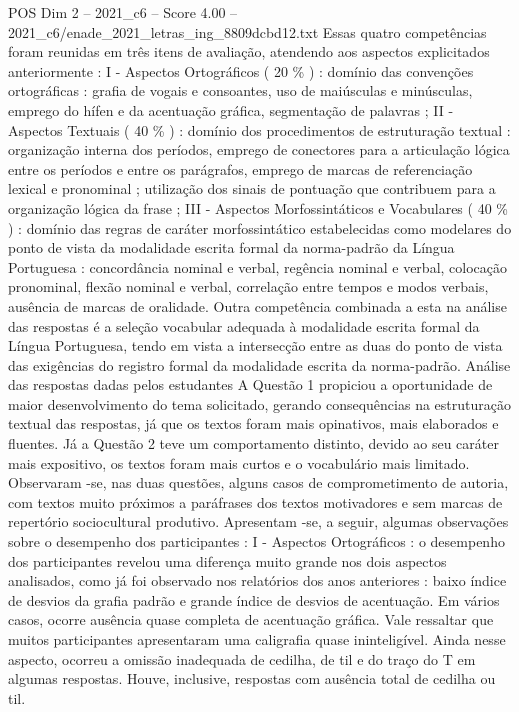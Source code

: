 \begin{textsample}{POS Dim 2 – 2021\_c6 – Score 4.00 – 2021\_c6/enade\_2021\_letras\_ing\_8809dcbd12.txt}
Essas quatro competências foram reunidas em três itens de avaliação, atendendo aos aspectos explicitados anteriormente : I - Aspectos Ortográficos ( 20 \% ) : domínio das convenções ortográficas : grafia de vogais e consoantes, uso de maiúsculas e minúsculas, emprego do hífen e da acentuação gráfica, segmentação de palavras ; II - Aspectos Textuais ( 40 \% ) : domínio dos procedimentos de estruturação textual : organização interna dos períodos, emprego de conectores para a articulação lógica entre os períodos e entre os parágrafos, emprego de marcas de referenciação lexical e pronominal ; utilização dos sinais de pontuação que contribuem para a organização lógica da frase ; III - Aspectos Morfossintáticos e Vocabulares ( 40 \% ) : domínio das regras de caráter morfossintático estabelecidas como modelares do ponto de vista da modalidade escrita formal da norma-padrão da Língua Portuguesa : concordância nominal e verbal, regência nominal e verbal, colocação pronominal, flexão nominal e verbal, correlação entre tempos e modos verbais, ausência de marcas de oralidade.
Outra competência combinada a esta na análise das respostas é a seleção vocabular adequada à modalidade escrita formal da Língua Portuguesa, tendo em vista a intersecção entre as duas do ponto de vista das exigências do registro formal da modalidade escrita da norma-padrão.
Análise das respostas dadas pelos estudantes A Questão 1 propiciou a oportunidade de maior desenvolvimento do tema solicitado, gerando consequências na estruturação textual das respostas, já que os textos foram mais opinativos, mais elaborados e fluentes.
Já a Questão 2 teve um comportamento distinto, devido ao seu caráter mais expositivo, os textos foram mais curtos e o vocabulário mais limitado.
Observaram -se, nas duas questões, alguns casos de comprometimento de autoria, com textos muito próximos a paráfrases dos textos motivadores e sem marcas de repertório sociocultural produtivo.
Apresentam -se, a seguir, algumas observações sobre o desempenho dos participantes : I - Aspectos Ortográficos : o desempenho dos participantes revelou uma diferença muito grande nos dois aspectos analisados, como já foi observado nos relatórios dos anos anteriores : baixo índice de desvios da grafia padrão e grande índice de desvios de acentuação.
Em vários casos, ocorre ausência quase completa de acentuação gráfica.
Vale ressaltar que muitos participantes apresentaram uma caligrafia quase ininteligível.
Ainda nesse aspecto, ocorreu a omissão inadequada de cedilha, de til e do traço do T em algumas respostas.
Houve, inclusive, respostas com ausência total de cedilha ou til.

\end{textsample}
